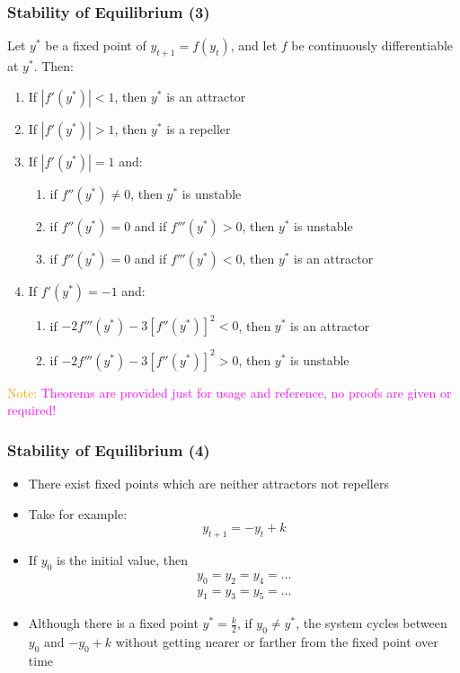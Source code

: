 \documentclass[10pt,usenames,dvipsnames]{beamer}
\theoremstyle{definition}
\begin{document}
\begin{frame}[fragile]
\frametitle{Stability of Equilibrium (3)}

\begin{theorem}
Let $y^{*}$ be a fixed point of $y_{t+1} = f(y_{t})$, and let $f$ be continuously differentiable at $y^{*}$. Then:
\begin{enumerate}
	\item If $|f'(y^{*})| < 1$, then $y^{*}$ is an attractor
	\item If $|f'(y^{*})| > 1$, then $y^{*}$ is a repeller
	\item If $|f'(y^{*})| = 1$ and:
	\begin{enumerate}
		\item if $f''(y^{*}) \neq 0$, then $y^{*}$ is unstable
		\item if $f''(y^{*}) = 0$ and if $f'''(y^{*}) > 0$, then $y^{*}$ is unstable
		\item if $f''(y^{*}) = 0$ and if $f'''(y^{*}) < 0$, then $y^{*}$ is an attractor
	\end{enumerate}
	\item If $f'(y^{*}) = -1$ and:
	\begin{enumerate}
		\item if $-2f'''(y^{*}) - 3[f''(y^{*})]^{2} < 0$, then $y^{*}$ is an attractor
		\item if $-2f'''(y^{*}) - 3[f''(y^{*})]^{2} > 0$, then $y^{*}$ is unstable
	\end{enumerate}
\end{enumerate}
\end{theorem}

\textcolor{orange}{Note:} \textcolor{magenta}{Theorems are provided just for usage and reference, no proofs are given or required!}

\end{frame}

\begin{frame}[fragile]
\frametitle{Stability of Equilibrium (4)}
\begin{itemize}
	\item There exist fixed points which are neither attractors not repellers
	\item Take for example:
	\[
		y_{t+1} = -y_{t} + k
	\]
	\item If $y_{0}$ is the initial value, then
	\[
		\begin{array}{lcl}
			y_{0} = y_{2} = y_{4} = \ldots\\
			y_{1} = y_{3} = y_{5} = \ldots
		\end{array}
	\]
	\item Although there is a fixed point $y^{*} = \displaystyle \frac{k}{2}$, if $y_{0} \neq y^{*}$, the system cycles between $y_{0}$ and $-y_{0} + k$ without getting nearer or farther from the fixed point over time
\end{itemize}
\end{frame}
\end{document}
